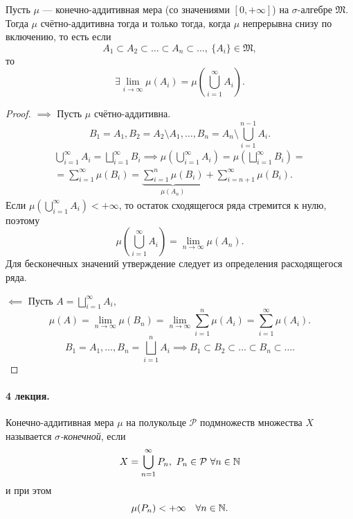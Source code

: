 \begin{theorem}
    Пусть $\mu$ — конечно-аддитивная мера (со значениями $[0, + \infty]$) на $\sigma$-алгебре $\mathfrak{M}$.
    Тогда $\mu$ счётно-аддитивна тогда и только тогда, когда $\mu$ непрерывна снизу по включению, то есть если
    \[A_1 \subset A_2 \subset \dots \subset A_n \subset \dots, \ \{A_i\} \in \mathfrak{M},\]
    то
    \[\exists \lim\limits_{i \to \infty} \mu(A_i) = \mu\left(\bigcup\limits_{i=1}^{\infty} A_i\right).\]
\end{theorem} 
\begin{proof}\tab

    \noindent\underline{$\implies$}
    Пусть $\mu$ счётно-аддитивна.
    \[B_1 = A_1, B_2 = A_2 \setminus A_1, \dots, B_n = A_n \setminus \bigcup\limits_{i=1}^{n-1} A_i.\]
    \begin{multline*}
        \bigcup\limits_{i=1}^{\infty} A_i = \bigsqcup\limits_{i=1}^{\infty} B_i \implies \mu\left(\bigcup\limits_{i=1}^{\infty} A_i\right) = \mu\left(\bigsqcup\limits_{i=1}^{\infty} B_i\right) =\\= \sum\limits_{i=1}^{\infty} \mu(B_i) = \underbrace{\sum\limits_{i=1}^{n} \mu(B_i)}_{\mu(A_n)} + \sum\limits_{i=n+1}^{\infty} \mu(B_i).
    \end{multline*}
    Если $\mu\left(\bigcup\limits_{i=1}^{\infty} A_i\right) < +\infty$, то остаток сходящегося ряда стремится к нулю, поэтому
    \[\mu\left(\bigcup\limits_{i=1}^{\infty} A_i\right) = \lim\limits_{n \to \infty} \mu(A_n).\]
    Для бесконечных значений утверждение следует из определения расходящегося ряда.

    \noindent\underline{$\impliedby$}
    Пусть $A = \bigsqcup\limits_{i=1}^{\infty} A_i$,
    \[\mu(A) = \lim\limits_{n \to \infty} \mu(B_n) = \lim\limits_{n \to \infty} \sum\limits_{i=1}^{n} \mu(A_i) = \sum\limits_{i=1}^{\infty} \mu(A_i).\]
    \[B_1 = A_1, \dots, B_n = \bigsqcup\limits_{i=1}^{n} A_i \implies B_1 \subset B_2 \subset \dots \subset B_n \subset \dots.\]
\end{proof} 


\paragraph{4 лекция.}

\begin{definition}
    Конечно-аддитивная мера $\mu$ на полукольце $\mathcal{P}$ подмножеств множества $X$ называется \textit{$\sigma$-конечной}, если 
    \[X = \bigcup\limits_{n=1}^{\infty} P_n, \ P_n \in \mathcal{P} \ \forall n \in \mathbb{N}\]
    и при этом 
    \[\mu(P_n) < + \infty \quad \forall n \in \mathbb{N}.\]
\end{definition} 

